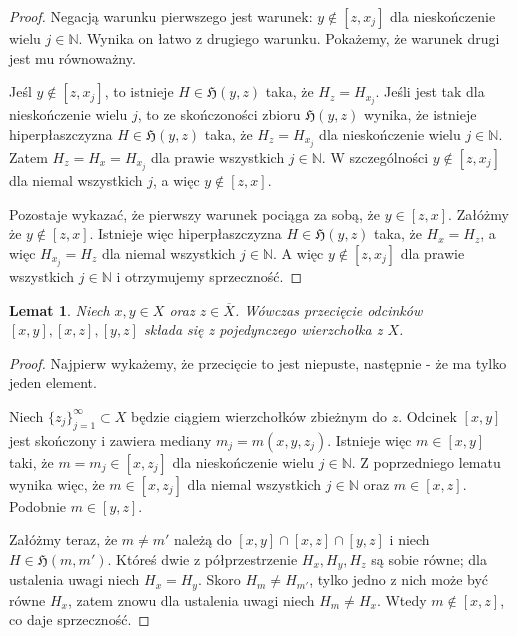 \documentclass[licencjacka]{pracamgr}
\theoremstyle{definition}
\theoremstyle{definition}
\theoremstyle{definition}
\theoremstyle{definition}
\theoremstyle{definition}
\theoremstyle{plain}
\newtheorem{lemma}{Lemat}[section]
\theoremstyle{plain}
\begin{document}
\begin{proof}
	Negacją warunku pierwszego jest warunek: $ y \notin [z,x_j] $ dla nieskończenie 
	wielu $ j \in \mathbb{N} $. Wynika on łatwo z drugiego warunku. Pokażemy, że warunek 
	drugi jest mu równoważny.
	
	Jeśl $ y \notin [z,x_j]  $, to istnieje $ H \in \mathfrak{H}(y,z) $ taka, że 
	$ H_z = H_{x_j} $. %
	Jeśli jest tak dla nieskończenie wielu $ j $, to ze skończoności zbioru 
	$ \mathfrak{H}(y,z) $ wynika, że istnieje hiperpłaszczyzna 
	$ H \in \mathfrak{H}(y,z)$ taka, że $ H_{z} = H_{x_j} $ dla nieskończenie wielu $ j \in 
	\mathbb{N} $. Zatem $ H_z = H_x = H_{x_j} $ dla prawie wszystkich $ j \in \mathbb{N} $. 
	W szczególności $ y \notin [z,x_j] $ dla niemal wszystkich $ j $, a więc 
	$ y \notin [z,x] $.
	
	Pozostaje wykazać, że pierwszy warunek pociąga za sobą, że $ y \in [z,x] $.
	Załóżmy że $ y \notin [z,x] $. Istnieje więc hiperpłaszczyzna  
	$ H \in \mathfrak{H}(y,z) $ taka, że $ H_x = H_z $, a więc $ H_{x_j} = H_{z} $ dla 
	niemal wszystkich $ j \in \mathbb{N} $. A więc $ y \notin [z,x_j] $ dla 
	prawie wszystkich $ j \in \mathbb{N} $ i otrzymujemy sprzeczność.
\end{proof}

\begin{lemma}
	Niech $ x,y \in X $ oraz $ z \in \overline{X} $. Wówczas przecięcie odcinków 
	$ [x,y], [x,z], [y,z] $ składa się z pojedynczego wierzchołka z $ X $.
\end{lemma}
\begin{proof}
	Najpierw wykażemy, że przecięcie to jest niepuste, następnie - że ma tylko jeden element.

	Niech $ \{z_j\}_{j = 1}^{\infty} \subset X $ będzie ciągiem wierzchołków zbieżnym 
	do $ z $. Odcinek $[x,y] $ jest skończony i zawiera mediany $ m_j = m(x,y,z_j) $. 
	Istnieje więc $ m \in [x,y] $ taki, że $ m = m_j \in [x,z_j] $ dla nieskończenie 
	wielu $ j \in \mathbb{N} $. Z poprzedniego lematu wynika więc, że $ m \in [x,z_j] $ dla 
	niemal wszystkich $ j \in \mathbb{N} $ oraz $ m \in [x,z] $. Podobnie $ m \in [y,z] $.

	Załóżmy teraz, że $ m \neq m' $ należą do $ [x,y] \cap [x,z] \cap [y,z] $ i niech 
	$ H \in \mathfrak{H}(m,m') $. Któreś dwie z półprzestrzenie $ H_x, H_y, H_z $ są 
	sobie równe; dla ustalenia uwagi niech $ H_x = H_y $. Skoro $ H_m \neq H_{m'} $, 
	tylko jedno z nich może być równe $ H_x $, zatem znowu dla ustalenia uwagi niech 
	$ H_m \neq H_x $. Wtedy $ m \notin [x,z] $, co daje sprzeczność.
\end{proof}
\end{document}
